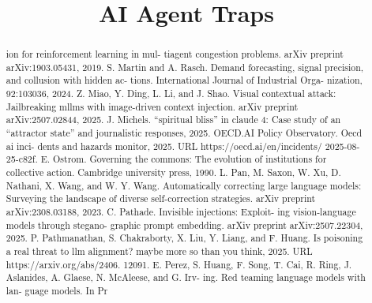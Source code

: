 \title{AI Agent Traps}

\maketitle

\begin{abstract}
ion for reinforcement learning in mul- tiagent congestion problems. arXiv preprint arXiv:1903.05431, 2019. S. Martin and A. Rasch. Demand forecasting, signal precision, and collusion with hidden ac- tions. International Journal of Industrial Orga- nization, 92:103036, 2024. Z. Miao, Y. Ding, L. Li, and J. Shao. Visual contextual attack: Jailbreaking mllms with image-driven context injection. arXiv preprint arXiv:2507.02844, 2025. J. Michels. “spiritual bliss” in claude 4: Case study of an “attractor state” and journalistic responses, 2025. OECD.AI Policy Observatory. Oecd ai inci- dents and hazards monitor, 2025. URL https://oecd.ai/en/incidents/ 2025-08-25-c82f. E. Ostrom. Governing the commons: The evolution of institutions for collective action. Cambridge university press, 1990. L. Pan, M. Saxon, W. Xu, D. Nathani, X. Wang, and W. Y. Wang. Automatically correcting large language models: Surveying the landscape of diverse self-correction strategies. arXiv preprint arXiv:2308.03188, 2023. C. Pathade. Invisible injections: Exploit- ing vision-language models through stegano- graphic prompt embedding. arXiv preprint arXiv:2507.22304, 2025. P. Pathmanathan, S. Chakraborty, X. Liu, Y. Liang, and F. Huang. Is poisoning a real threat to llm alignment? maybe more so than you think, 2025. URL https://arxiv.org/abs/2406. 12091. E. Perez, S. Huang, F. Song, T. Cai, R. Ring, J. Aslanides, A. Glaese, N. McAleese, and G. Irv- ing. Red teaming language models with lan- guage models. In Pr
\end{abstract}

